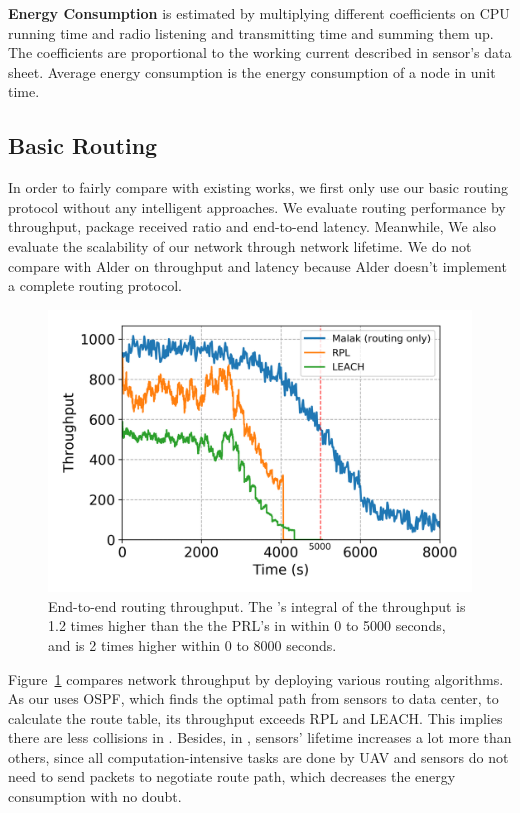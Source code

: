\textbf{Energy Consumption} is estimated by multiplying different coefficients on
CPU running time and radio listening and transmitting time and summing them up.
The coefficients are proportional to the working current described in sensor's
data sheet. Average energy consumption is the energy consumption of a node in
unit time.

\subsection{Basic Routing}

In order to fairly compare with existing works, we first only use our basic
{\sdn} routing protocol without any intelligent approaches. We evaluate routing
performance by throughput, package received ratio and end-to-end latency.
Meanwhile, We also evaluate the scalability of our network through network
lifetime. We do not compare {\sdn} with Alder on throughput and latency because
Alder doesn't implement a complete routing protocol.

\begin{figure}[!h]
	\centering
	\includegraphics[width=.95\columnwidth]{Figure/throughput}
	\vspace{-0.1in}
	\caption{End-to-end routing throughput.
		\textnormal{
			The {\sdn}'s integral of the throughput is 1.2 times higher than the
			the PRL's in within 0 to 5000 seconds, and is 2 times higher within 0
			to 8000 seconds.
	}}
	\label{fig:throughput}
\end{figure}

Figure~\ref{fig:throughput} compares network throughput by deploying various
routing algorithms. As our {\sdn} uses OSPF, which finds the optimal path from
sensors to data center, to calculate the route table, its throughput exceeds RPL
and LEACH. This implies there are less collisions in {\sdn}. Besides, 
in {\sdn}, sensors' lifetime increases a lot more than
others, since all computation-intensive tasks are done by UAV and sensors do
not need to send packets to negotiate route path, which decreases the energy
consumption with no doubt.

